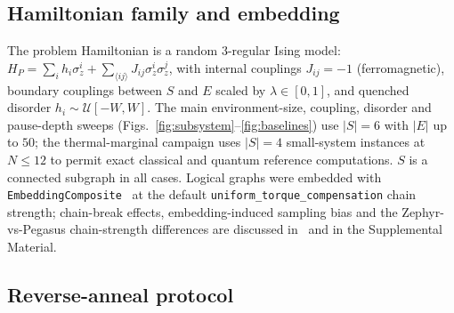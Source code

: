 \documentclass[aps,prapplied,reprint,superscriptaddress,floatfix,nofootinbib]{revtex4-2}
\begin{document}
\subsection{Hamiltonian family and embedding}

The problem Hamiltonian is a random 3-regular Ising model: $H_P = \sum_i h_i \sigma_z^i + \sum_{\langle ij \rangle} J_{ij}\sigma_z^i\sigma_z^j$, with internal couplings $J_{ij}=-1$ (ferromagnetic), boundary couplings between $S$ and $E$ scaled by $\lambda\in[0,1]$, and quenched disorder $h_i\sim\mathcal{U}[-W,W]$.
The main environment-size, coupling, disorder and pause-depth sweeps (Figs.~\ref{fig:subsystem}--\ref{fig:baselines}) use $|S|=6$ with $|E|$ up to $50$; the thermal-marginal campaign uses $|S|=4$ small-system instances at $N\le 12$ to permit exact classical and quantum reference computations.  $S$ is a connected subgraph in all cases.
Logical graphs were embedded with \texttt{EmbeddingComposite}~\cite{cai2014minor} at the default \texttt{uniform\_torque\_compensation} chain strength; chain-break effects, embedding-induced sampling bias and the Zephyr-vs-Pegasus chain-strength differences are discussed in~\cite{marshall2020embedding} and in the Supplemental Material.

\subsection{Reverse-anneal protocol}
\end{document}
